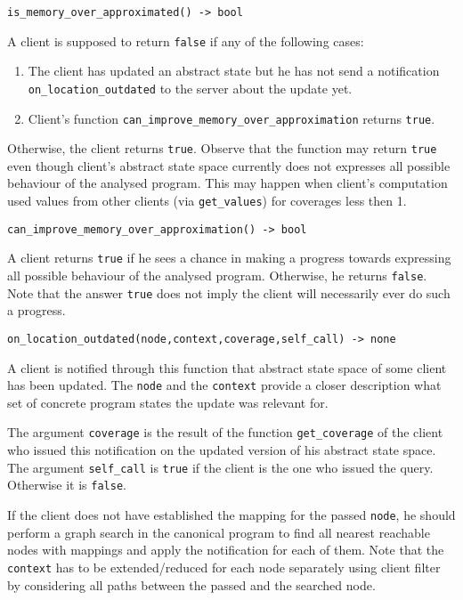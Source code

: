\documentclass[envcountsame]{llncs}
\begin{document}
\noindent\texttt{is\_memory\_over\_approximated() -> bool}

A client is supposed to return \texttt{false} if any of the following cases:
\begin{enumerate}
\item The client has updated an abstract state but he has not send a notification
\texttt{on\_location\_outdated} to the server about the update yet.
\item Client's function \texttt{can\_improve\_memory\_over\_approximation} returns \texttt{true}.
\end{enumerate}
Otherwise, the client returns \texttt{true}. Observe that the function may
return \texttt{true} even though client's abstract state space currently does
not expresses all possible behaviour of the analysed program. This may happen
when client's computation used values from other clients (via
\texttt{get\_values}) for coverages less then 1. \newline

\noindent\texttt{can\_improve\_memory\_over\_approximation() -> bool}

A client returns \texttt{true} if he sees a chance in making a progress
towards expressing all possible behaviour of the analysed program. Otherwise, he
returns \texttt{false}. Note that the answer \texttt{true} does not imply the
client will necessarily ever do such a progress. \newline

\noindent\texttt{on\_location\_outdated(node,context,coverage,self\_call) -> none}

A client is notified through this function that abstract state space of some
client has been updated. The \texttt{node} and the \texttt{context} provide a
closer description what set of concrete program states the update was relevant
for.

The argument \texttt{coverage} is the result of the function
\texttt{get\_coverage} of the client who issued this notification on the updated
version of his abstract state space. The argument \texttt{self\_call} is
\texttt{true} if the client is the one who issued the query. Otherwise it is
\texttt{false}.

If the client does not have established the mapping for the passed
\texttt{node}, he should perform a graph search in the canonical program to find
all nearest reachable nodes with mappings and apply the notification for each of
them. Note that the \texttt{context} has to be extended/reduced for each node
separately using client filter by considering all paths between the passed and
the searched node. \newline
\end{document}
